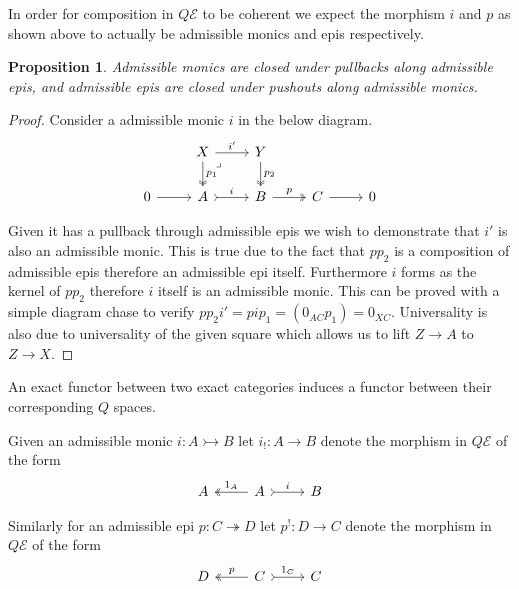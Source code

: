 \documentclass[12pt]{report}
\numberwithin{equation}{section}
\newtheorem{proposition}[dummy]{Proposition}
\begin{document}
	
	In order for composition in \( Q\mathcal{E}\) to be coherent we expect the morphism \( i \) and \( p \) as shown above to actually be admissible monics and epis respectively.
	\begin{proposition}Admissible monics are closed under pullbacks along admissible epis, and admissible epis are closed under pushouts along admissible monics.
	\end{proposition}
	\begin{proof}
		Consider a admissible monic \( i \) in the below diagram.
		\[\begin{tikzcd}
			& X & Y \\
			0 & A & B & C & 0
			\arrow["{i'}", from=1-2, to=1-3]
			\arrow["{p_1}", two heads, from=1-2, to=2-2]
			\arrow["\lrcorner"{anchor=center, pos=0.125}, draw=none, from=1-2, to=2-3]
			\arrow["{p_2}", two heads, from=1-3, to=2-3]
			\arrow[from=2-1, to=2-2]
			\arrow["i", tail, from=2-2, to=2-3]
			\arrow["p", two heads, from=2-3, to=2-4]
			\arrow[from=2-4, to=2-5]
		\end{tikzcd}\]
		
		Given it has a pullback through admissible epis we wish to demonstrate that \( i' \) is also an admissible monic. This is true due to the fact that \( pp_2 \) is a composition of admissible epis therefore an admissible epi itself. Furthermore \( i \) forms as the kernel of \( pp_2 \) therefore \( i \) itself is an admissible monic. This can be proved with a simple diagram chase to verify \( pp_2i'=pip_1=(0_{AC}p_1)=0_{XC} \). Universality is also due to universality of the given square which allows us to lift \( Z\to A \) to \( Z \to X \).
		\end{proof}
	
	An exact functor between two exact categories induces a functor between their corresponding \( Q \) spaces.
	
	Given an admissible monic \( i:A \rightarrowtail B \) let \( i_!: A \to B \) denote the morphism in \( Q\mathcal{E} \) of the form 		
	\[\begin{tikzcd}
		A & A & B
		\arrow["{1_A}"', two heads, from=1-2, to=1-1]
		\arrow["i", tail, from=1-2, to=1-3]
	\end{tikzcd}\]
	
	Similarly for an admissible epi \( p: C \twoheadrightarrow	D \) let \( p^!: D \to C  \) denote the morphism in \( Q \mathcal{E} \) of the form
	\[\begin{tikzcd}
		D & C & C
		\arrow["p"', two heads, from=1-2, to=1-1]
		\arrow["{1_C}", tail, from=1-2, to=1-3]
	\end{tikzcd}\]
	
\end{document}
